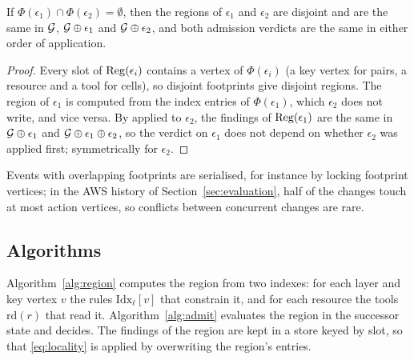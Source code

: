\begin{proposition}[Commutation]\label{prop:commute}
If $\Phi(\epsilon_1) \cap \Phi(\epsilon_2) = \emptyset$, then the regions of $\epsilon_1$ and $\epsilon_2$ are disjoint and are the same in $\mathcal{G}$, $\mathcal{G} \oplus \epsilon_1$ and $\mathcal{G} \oplus \epsilon_2$, and both admission verdicts are the same in either order of application.
\end{proposition}
\begin{proof}
Every slot of $\mathrm{Reg}(\epsilon_i)$ contains a vertex of $\Phi(\epsilon_i)$ (a key vertex for pairs, a resource and a tool for cells), so disjoint footprints give disjoint regions. The region of $\epsilon_1$ is computed from the index entries of $\Phi(\epsilon_1)$, which $\epsilon_2$ does not write, and vice versa. By  applied to $\epsilon_2$, the findings of $\mathrm{Reg}(\epsilon_1)$ are the same in $\mathcal{G} \oplus \epsilon_1$ and $\mathcal{G} \oplus \epsilon_1 \oplus \epsilon_2$, so the verdict on $\epsilon_1$ does not depend on whether $\epsilon_2$ was applied first; symmetrically for $\epsilon_2$.
\end{proof}
Events with overlapping footprints are serialised, for instance by locking footprint vertices; in the AWS history of Section~\ref{sec:evaluation}, half of the changes touch at most \awsChangedMed{} action vertices, so conflicts between concurrent changes are rare.

\subsection{Algorithms}
Algorithm~\ref{alg:region} computes the region from two indexes: for each layer and key vertex $v$ the rules $\mathrm{Idx}_\ell[v]$ that constrain it, and for each resource the tools $\mathrm{rd}(r)$ that read it. Algorithm~\ref{alg:admit} evaluates the region in the successor state and decides. The findings of the region are kept in a store keyed by slot, so that \eqref{eq:locality} is applied by overwriting the region's entries.

